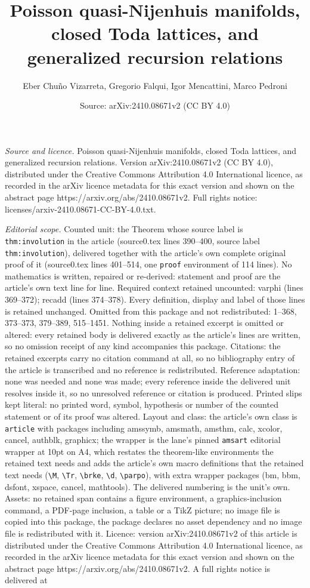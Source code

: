 \documentclass[10pt,a4paper]{amsart}
\title[Poisson quasi-Nijenhuis manifolds, closed Toda lattices, and]{Poisson quasi-Nijenhuis manifolds, closed Toda lattices, and generalized recursion relations}
\author{Eber Chu\~no Vizarreta, Gregorio Falqui, Igor Mencattini, Marco Pedroni}
\date{Source: arXiv:2410.08671v2 (CC BY 4.0)}
\begin{document}
\maketitle

\noindent\emph{Source and licence.} Poisson quasi-Nijenhuis manifolds, closed Toda lattices, and generalized recursion relations. Version arXiv:2410.08671v2 (CC BY 4.0), distributed under the Creative Commons Attribution 4.0 International licence, as recorded in the arXiv licence metadata for this exact version and shown on the abstract page https://arxiv.org/abs/2410.08671v2. Full rights notice: licenses/arxiv-2410.08671-CC-BY-4.0.txt.\par\smallskip

\noindent\textit{Editorial scope.} Counted unit: the Theorem whose source label is \texttt{thm:involution} in the article (source0.tex lines 390--400, source label \texttt{thm:involution}), delivered together with the article's own complete original proof of it (source0.tex lines 401--514, one \texttt{proof} environment of 114 lines). No mathematics is written, repaired or re-derived: statement and proof are the article's own text line for line. Required context retained uncounted: varphi (lines 369--372); recadd (lines 374--378). Every definition, display and label of those lines is retained unchanged. Omitted from this package and not redistributed: 1--368, 373--373, 379--389, 515--1451. Nothing inside a retained excerpt is omitted or altered: every retained body is delivered exactly as the article's lines are written, so no omission receipt of any kind accompanies this package. Citations: the retained excerpts carry no citation command at all, so no bibliography entry of the article is transcribed and no reference is redistributed. Reference adaptation: none was needed and none was made; every reference inside the delivered unit resolves inside it, so no unresolved reference or citation is produced. Printed slips kept literal: no printed word, symbol, hypothesis or number of the counted statement or of its proof was altered. Layout and class: the article's own class is \texttt{article} with packages including amssymb, amsmath, amsthm, calc, xcolor, cancel, authblk, graphicx; the wrapper is the lane's pinned \texttt{amsart} editorial wrapper at 10pt on A4, which restates the theorem-like environments the retained text needs and adds the article's own macro definitions that the retained text needs (\texttt{\textbackslash M}, \texttt{\textbackslash Tr}, \texttt{\textbackslash brke}, \texttt{\textbackslash d}, \texttt{\textbackslash parpo}), with extra wrapper packages (bm, bbm, dsfont, xspace, cancel, mathtools). The delivered numbering is the unit's own. Assets: no retained span contains a figure environment, a graphics-inclusion command, a PDF-page inclusion, a table or a TikZ picture; no image file is copied into this package, the package declares no asset dependency and no image file is redistributed with it. Licence: version arXiv:2410.08671v2 of this article is distributed under the Creative Commons Attribution 4.0 International licence, as recorded in the arXiv licence metadata for this exact version and shown on the abstract page https://arxiv.org/abs/2410.08671v2. A full rights notice is delivered at 
\end{document}
